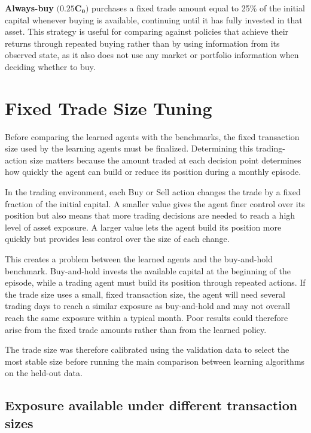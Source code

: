 \textbf{Always-buy} \(\mathbf{(0.25}\mathbf{C}_{\mathbf{0}}\mathbf{)}\)
purchases a fixed trade amount equal to 25\% of the initial capital
whenever buying is available, continuing until it has fully invested in
that asset. This strategy is useful for comparing against policies that
achieve their returns through repeated buying rather than by using
information from its observed state, as it also does not use any market
or portfolio information when deciding whether to buy.

\section{Fixed Trade Size Tuning}

Before comparing the learned agents with the benchmarks, the fixed
transaction size used by the learning agents must be finalized.
Determining this trading-action size matters because the amount traded
at each decision point determines how quickly the agent can build or
reduce its position during a monthly episode.

In the trading environment, each Buy or Sell action changes the trade by
a fixed fraction of the initial capital. A smaller value gives the agent
finer control over its position but also means that more trading
decisions are needed to reach a high level of asset exposure. A larger
value lets the agent build its position more quickly but provides less
control over the size of each change.

This creates a problem between the learned agents and the buy-and-hold
benchmark. Buy-and-hold invests the available capital at the beginning
of the episode, while a trading agent must build its position through
repeated actions. If the trade size uses a small, fixed transaction
size, the agent will need several trading days to reach a similar
exposure as buy-and-hold and may not overall reach the same exposure
within a typical month. Poor results could therefore arise from the
fixed trade amounts rather than from the learned policy.

The trade size was therefore calibrated using the validation data to
select the most stable size before running the main comparison between
learning algorithms on the held-out data.

\subsection{Exposure available under different transaction sizes}

